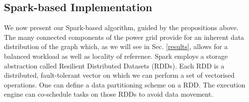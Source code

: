 \subsection{Spark-based Implementation}
We now present our Spark-based algorithm, guided by the propositions above. The many connected components of the power grid provide for an inherent data distribution of the graph which, as we will see in Sec. \ref{results}, allows for a balanced workload as well as locality of reference. Spark employs a storage abstraction called Resilient Distributed Datasets (RDDs). Each RDD is a distributed, fault-tolerant vector on which we can perform a set of vectorised operations. One can define a data partitioning scheme on a RDD. The execution engine can co-schedule tasks on those RDDs to avoid data movement. 
%
%
